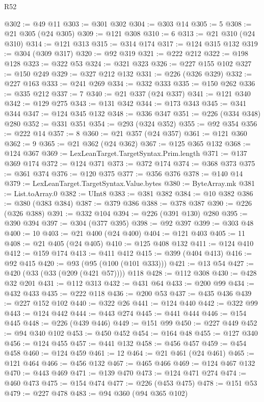 \begin{lexlean}{R52}
\begin{coremodule}
@302 := @49 @11
@303 := @301 @302
@304 := @303 @14
@305 := 5
@308 := @21 @305 (@24 @305)
@309 := @121 @308
@310 := 6
@313 := @21 @310 (@24 @310)
@314 := @121 @313
@315 := @314 @174
@317 := @124 @315 @132
@319 := @304 (@309 @317)
@320 := @92 @319
@321 := @222 @212
@322 := @198 @128
@323 := @322 @53
@324 := @321 @323
@326 := @227 @155 @102
@327 := @150 @249
@329 := @327 @212 @132
@331 := @226 (@326 @329)
@332 := @227 @163
@333 := @241 @269
@334 := @332 @333
@335 := @150 @262
@336 := @335 @212
@337 := 7
@340 := @21 @337 (@24 @337)
@341 := @121 @340
@342 := @129 @275
@343 := @131 @342
@344 := @173 @343
@345 := @341 @344
@347 := @124 @345 @132
@348 := @336 @347
@351 := @226 (@334 @348) @280
@352 := @331 @351
@354 := @293 (@324 @352)
@355 := @92 @354
@356 := @222 @14
@357 := 8
@360 := @21 @357 (@24 @357)
@361 := @121 @360
@362 := 9
@365 := @21 @362 (@24 @362)
@367 := @125 @365 @132
@368 := @124 @367
@369 := LexLeanTarget.TargetSyntax.Prim.length
@371 := @137 @369 @174
@372 := @124 @371
@373 := @372 @174
@374 := @368 @373
@375 := @361 @374
@376 := @120 @375
@377 := @356 @376
@378 := @140 @14
@379 := LexLeanTarget.TargetSyntax.Value.bytes
@380 := ByteArray.mk
@381 := List.toArray.{0}
@382 := UInt8
@383 := @381 @382
@384 := @10 @382
@386 := @380 (@383 @384)
@387 := @379 @386
@388 := @378 @387
@390 := @226 (@326 @388)
@391 := @332 @104
@394 := @226 (@391 @130) @280
@395 := @390 @394
@397 := @304 (@377 @395)
@398 := @92 @397
@399 := @303 @48
@400 := 10
@403 := @21 @400 (@24 @400)
@404 := @121 @403
@405 := 11
@408 := @21 @405 (@24 @405)
@410 := @125 @408 @132
@411 := @124 @410
@412 := @159 @174
@413 := @411 @412
@415 := @399 (@404 @413)
@416 := @92 @415
@420 := @93 (@95 (@100 (@101 @333)))
@421 := @13 @54
@427 := @420 (@33 (@33 (@209 (@421 @57)))) @118
@428 := @112 @308
@430 := @428 @32 @201
@431 := @112 @313
@432 := @431 @64
@433 := @200 @99
@434 := @432 @433
@435 := @222 @118
@436 := @200 @53
@437 := @435 @436
@439 := @227 @152 @102
@440 := @322 @26
@441 := @124 @440
@442 := @322 @99
@443 := @124 @442
@444 := @443 @274
@445 := @441 @444
@446 := @154 @445
@448 := @226 (@439 @446)
@449 := @151 @99
@450 := @227 @449
@452 := @94 @340 @102
@453 := @450 @452
@454 := @164 @48
@455 := @127 @340
@456 := @124 @455
@457 := @441 @132
@458 := @456 @457
@459 := @454 @458
@460 := @124 @459
@461 := 12
@464 := @21 @461 (@24 @461)
@465 := @121 @464
@466 := @456 @132
@467 := @465 @466
@469 := @124 @467 @132
@470 := @443 @469
@471 := @139 @470
@473 := @124 @471 @274
@474 := @460 @473
@475 := @154 @474
@477 := @226 (@453 @475)
@478 := @151 @53
@479 := @227 @478
@483 := @94 @360 (@94 @365 @102)

\end{coremodule}
\end{lexlean}
